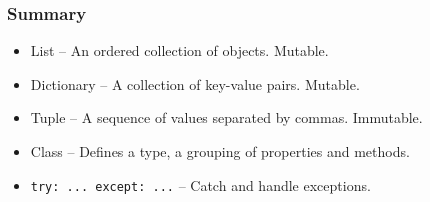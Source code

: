 \documentclass{beamer}
\begin{document}
\begin{frame}[fragile]
\frametitle{Summary}
\begin{itemize}
\item List -- An ordered collection of objects. Mutable.
\item Dictionary -- A collection of key-value pairs. Mutable.
\item Tuple -- A sequence of values separated by commas. Immutable.
\item Class -- Defines a type, a grouping of properties and methods.
\item \lstinline{try: ... except: ...} -- Catch and handle exceptions.
\end{itemize}
\end{frame}

%   
%   
\end{document}
